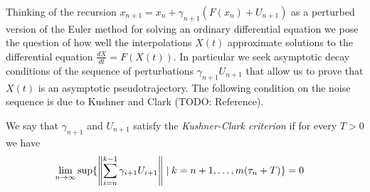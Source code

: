 Thinking of the recursion $x_{n+1} = x_n + \gamma_{n+1} (F(x_n) + U_{n+1})$ as a perturbed version of the Euler method for solving an ordinary differential equation we pose the question of how well the interpolations $X(t)$ approximate solutions to the differential equation $\frac{dX}{dt} = F(X(t))$.  In particular we seek asymptotic decay conditions of the sequence of perturbations $\gamma_{n+1} U_{n+1}$ that allow us to prove that $X(t)$ is an asymptotic pseudotrajectory.  The following condition on the noise sequence is due to Kushner and Clark (TODO: Reference).
\begin{defn}We say that $\gamma_{n+1}$ and $U_{n+1}$ satisfy the \emph{Kushner-Clark criterion} if for every $T > 0$ we have
\begin{align*}
\lim_{n \to \infty} \sup \lbrace \left \lVert \sum_{i=n}^{k-1} \gamma_{i+1} U_{i + 1} \right \rVert \mid k=n+1, \dotsc, m(\tau_n+T) \rbrace &= 0
\end{align*}
\end{defn}

